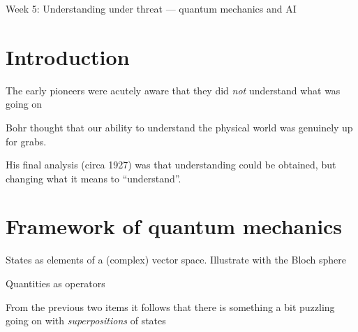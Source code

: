 Week 5: Understanding under threat --- quantum mechanics and AI




\section{Introduction}




\item The early pioneers were acutely aware that they did \emph{not}
  understand what was going on
\item Bohr thought that our ability to understand the physical world
  was genuinely up for grabs.
\item His final analysis (circa 1927) was that understanding could be
  obtained, but changing what it means to ``understand''.

\section{Framework of quantum mechanics}

\begin{frame}

\item States as elements of a (complex) vector space. Illustrate with
  the Bloch sphere
  
\item Quantities as operators 

From the previous two items it follows that there is something a bit
puzzling going on with \emph{superpositions} of states

\end{frame}

